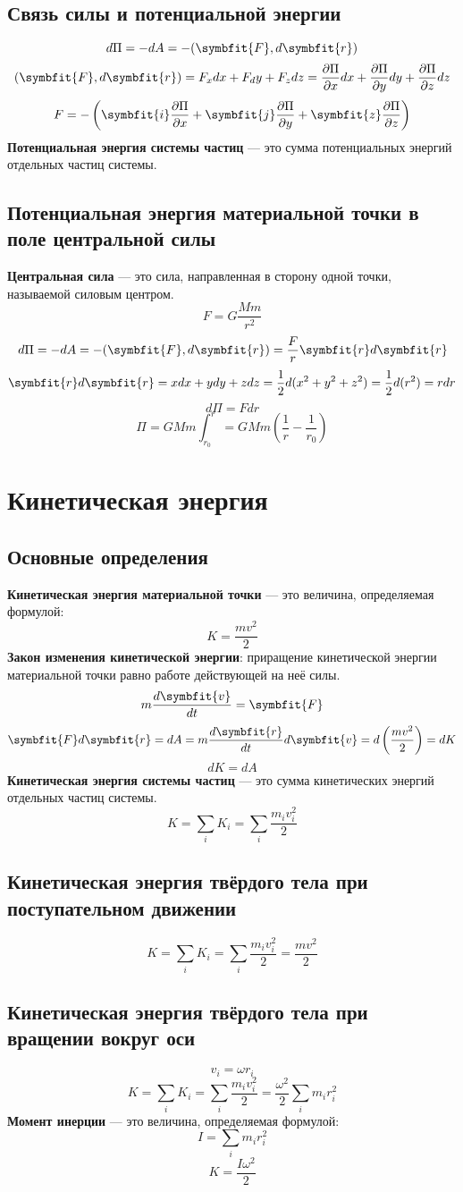 \documentclass[fleqn,a4paper,12pt,titlepage,finall]{article}
\newcommand\vv[1]{\symbfit{#1}}
\begin{document}
\subsection{Связь силы и потенциальной энергии}
\[d\Pi = -dA = -(\vv{F}, d\vv{r})\]
\[(\vv{F}, d\vv{r}) = F_xdx+F_dy+F_zdz = \frac{\partial \Pi}{\partial x}dx +
\frac{\partial \Pi}{\partial y}dy + \frac{\partial \Pi}{\partial z}dz\]
\[F = -\left( \vv{i}\frac{\partial \Pi}{\partial x} +
\vv{j}\frac{\partial \Pi}{\partial y} + \vv{z}\frac{\partial \Pi}{\partial z}
\right)\]
{\bf Потенциальная энергия системы частиц} --- это сумма потенциальных энергий
отдельных частиц системы.
\subsection{Потенциальная энергия материальной точки в поле центральной силы}
{\bf Центральная сила} --- это сила, направленная в сторону одной точки,
называемой силовым центром.
\[F = G\frac{Mm}{r^2}\]
\[d\Pi = -dA = -(\vv{F}, d\vv{r}) = \frac{F}{r}\vv{r}d\vv{r}\]
\[\vv{r}d\vv{r} = xdx + ydy + zdz = \frac{1}{2}d(x^2+y^2+z^2) =
\frac{1}{2}d(r^2) = rdr\]
\[d\Pi = Fdr\]
\[\Pi = GMm\int_{r_0}^r = GMm\left(\frac{1}{r} - \frac{1}{r_0}\right)\]

\section{Кинетическая энергия}
\subsection{Основные определения}
{\bf Кинетическая энергия материальной точки} --- это величина, определяемая
формулой:
\[K = \frac{mv^2}{2}\]
{\bf Закон изменения кинетической энергии}: приращение кинетической энергии
материальной точки равно работе действующей на неё силы.
\[m\frac{d\vv{v}}{dt} = \vv{F}\]
\[\vv{F}d\vv{r} = dA = m\frac{d\vv{r}}{dt}d\vv{v} =
d\left(\frac{mv^2}{2}\right) = dK\]
\[\boxed{dK = dA}\]
{\bf Кинетическая энергия системы частиц} --- это сумма кинетических энергий
отдельных частиц системы.
\[K = \sum_iK_i = \sum_i\frac{m_iv_i^2}{2}\]
\subsection{Кинетическая энергия твёрдого тела при поступательном движении}
\[K = \sum_iK_i = \sum_i\frac{m_iv_i^2}{2} = \frac{mv^2}{2}\]
\subsection{Кинетическая энергия твёрдого тела при вращении вокруг оси}
\[v_i = \omega r_i\]
\[K = \sum_iK_i = \sum_i\frac{m_iv_i^2}{2} = \frac{\omega^2}{2}\sum_im_ir_i^2\]
{\bf Момент инерции} --- это величина, определяемая формулой:
\[I = \sum_im_ir_i^2\]
\[K = \frac{I\omega^2}{2}\]
\end{document}
